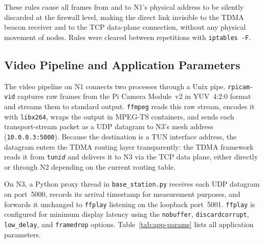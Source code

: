 These rules cause all frames from and to N1's physical address to be
silently discarded at the firewall level, making the direct link invisible
to the TDMA beacon receiver and to the TCP data-plane connection, without
any physical movement of nodes. Rules were cleared between repetitions
with \texttt{iptables -F}.

\subsection{Video Pipeline and Application Parameters}
\label{subsec:video-pipeline}

The video pipeline on N1 connects two processes through a Unix pipe.
\texttt{rpicam-vid} captures raw frames from the Pi Camera Module~v2 in
YUV~4:2:0 format and streams them to standard output. \texttt{ffmpeg} reads
this raw stream, encodes it with \texttt{libx264}, wraps the output in
MPEG-TS containers, and sends each transport-stream packet as a UDP datagram
to N3's mesh address (\texttt{10.0.0.3:5000}). Because the destination is
a TUN interface address, the datagram enters the TDMA routing layer
transparently: the TDMA framework reads it from \texttt{tun\textit{id}} and
delivers it to N3 via the TCP data plane, either directly or through N2
depending on the current routing table.

On N3, a Python proxy thread in \texttt{base\_station.py} receives each
UDP datagram on port~5000, records its arrival timestamp for measurement
purposes, and forwards it unchanged to \texttt{ffplay} listening on the
loopback port~5001. \texttt{ffplay} is configured for minimum display latency
using the \texttt{nobuffer}, \texttt{discardcorrupt}, \texttt{low\_delay},
and \texttt{framedrop} options. Table~\ref{tab:app-params} lists all
application parameters.

